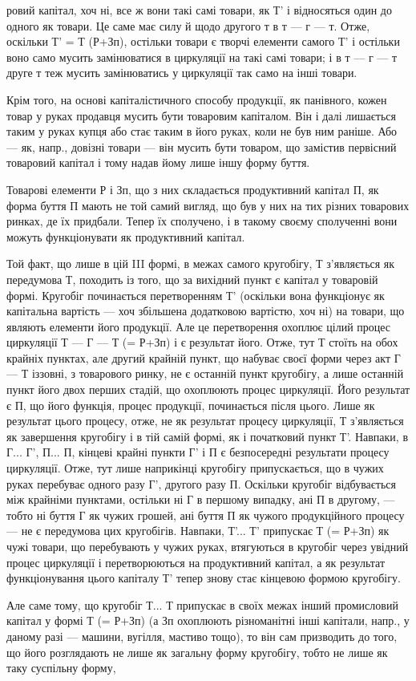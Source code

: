 ровий капітал, хоч ні, все ж вони такі самі товари, як Т' і відносяться один до одного як товари. Це
саме має силу й щодо другого т в т — г — т. Отже, оскільки Т' = Т (Р+Зп), остільки товари є творчі
елементи самого Т' і остільки воно само мусить замінюватися в циркуляції на такі самі товари; і в т
— г — т друге т теж мусить замінюватись у циркуляції так само на інші товари.

Крім того, на основі капіталістичного способу продукції, як панівного, кожен товар у руках продавця
мусить бути товаровим капіталом. Він і далі лишається таким у руках купця або стає таким в його
руках, коли не був ним раніше. Або — як, напр., довізні товари — він мусить бути товаром, що
замістив первісний товаровий капітал і тому надав йому лише іншу форму буття.

Товарові елементи Р і Зп, що з них складається продуктивний капітал П, як форма буття П мають не той
самий вигляд, що був у них на тих різних товарових ринках, де їх придбали. Тепер їх сполучено, і в
такому своєму сполученні вони можуть функціонувати як продуктивний капітал.

Той факт, що лише в цій III формі, в межах самого кругобігу, Т з’являється як передумова Т, походить
із того, що за вихідний пункт є капітал у товаровій формі. Кругобіг починається перетворенням Т'
(оскільки вона функціонує як капітальна вартість — хоч збільшена додатковою вартістю, хоч ні) на
товари, що являють елементи його продукції. Але це перетворення охоплює цілий процес циркуляції Т —
Г — Т (= Р+Зп) і є результат його. Отже, тут Т стоїть на обох крайніх пунктах, але другий крайній
пункт, що набуває своєї форми через акт Г
— Т іззовні, з товарового ринку, не є останній пункт кругобігу, а лише останній пункт його двох
перших стадій, що охоплюють процес циркуляції. Його результат є П, що його функція, процес
продукції, починається після цього. Лише як результат цього процесу, отже, не як результат процесу
циркуляції, Т з’являється як завершення кругобігу і в тій самій формі, як і початковий пункт Т'.
Навпаки, в Г... Г', П... П, кінцеві крайні пункти Г' і П є безпосередні результати процесу
циркуляції. Отже, тут лише наприкінці кругобігу припускається, що в чужих руках перебуває одного
разу Г', другого разу П. Оскільки кругобіг відбувається між крайніми пунктами, остільки ні Г в
першому випадку, ані П в другому, — тобто ні буття Г як чужих грошей, ані буття П як чужого
продукційного процесу — не є передумова цих кругобігів. Навпаки, Т'... Т' припускає Т (= Р+Зп) як
чужі товари,
що перебувають у чужих руках, втягуються в кругобіг через увідний процес циркуляції і перетворюються
на продуктивний капітал, а як результат функціонування цього капіталу Т' тепер знову стає кінцевою
формою кругобігу.

Але саме тому, що кругобіг Т... Т припускає в своїх межах інший промисловий капітал у формі Т (=
Р+Зп) (а Зп охоплюють різноманітні інші капітали, напр., у даному разі — машини, вугілля, мастиво
тощо), то він сам призводить до того, що його розглядають не лише як загальну форму кругобігу, тобто
не лише як таку суспільну форму,
